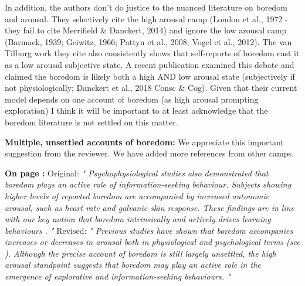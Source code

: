 \documentclass[utf8]{article}
\newenvironment{reply}  
    {\color{Blue}\noindent\newline}
    {\newline}
\newcommand{\revise}[3]{
    \noindent
    \newline
    \textbf{On page {#1}:}\newline
    \newline
    Original:\newline
    \textit{"#2"}
    \newline
    \newline
    Revised:\newline
    \textit{"#3"}\newline}
\begin{document}
        
        In addition, the authors don't do justice to the nuanced literature on boredom and arousal. They selectively cite the high arousal camp (London et al., 1972 - they fail to cite Merrifield \& Danckert, 2014) and ignore the low arousal camp (Barmack, 1939; Geiwitz, 1966; Pattyn et al., 2008; Vogel et al., 2012). The van Tilburg work they cite also consistently shows that self-reports of boredom cast it as a low arousal subjective state. A recent publication examined this debate and claimed the boredom is likely both a high AND low arousal state (subjectively if not physiologically; Danckert et al., 2018 Consc \& Cog). Given that their current model depends on one account of boredom (as high arousal prompting exploration) I think it will be important to at least acknowledge that the boredom literature is not settled on this matter.
        
        \begin{reply}
            \textbf{Multiple, unsettled accounts of boredom:}
            We appreciate this important suggestion from the reviewer. We have added more references from other camps.

            \revise{\pageref{rev:arousal}}
                {
                  Psychophysiological studies also demonstrated that boredom plays an active role of information-seeking behaviour. Subjects showing higher levels of reported boredom are accompanied by increased autonomic arousal, such as heart rate and galvanic skin response. These findings are in line with our key notion that boredom intrinsically and actively drives learning behaviours \citep{london1972increase, harris2000correlates}.
                }
                {
                  Previous studies have shown that boredom accompanies increases \citep{berlyne1960conflict, london1972increase, harris2000correlates} or decreases \citep{barmack1939definition, geiwitz1966structure, pattyn2008psychophysiological, vogel2012definition, mikulas1993essence} in arousal both in physiological and psychological terms (see \cite{eastwood2012unengaged, fahlman2013development, Merrifield2014, Danckert.2018}). Although the precise account of boredom is still largely unsettled, the high arousal standpoint suggests that boredom may play an active role in the emergence of explorative and information-seeking behaviours.
                }
        \end{reply}
        
\end{document}
